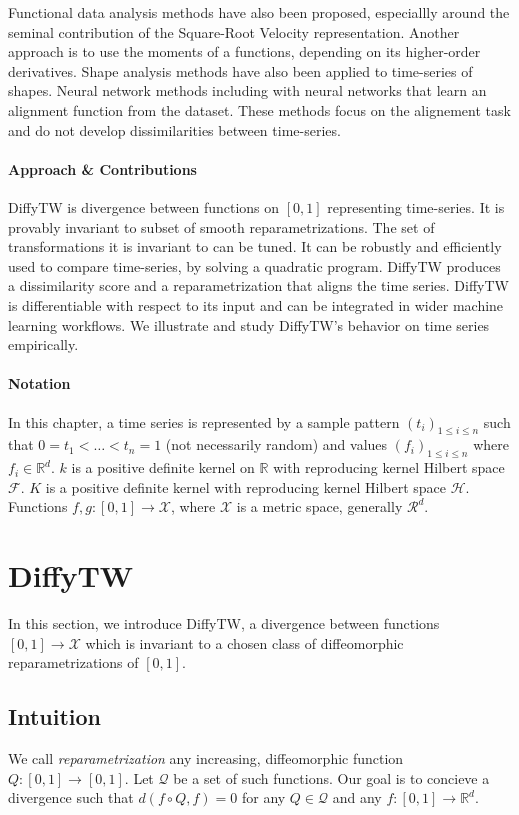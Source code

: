 Functional data analysis methods have also been proposed, especiallly around the seminal contribution of the Square-Root Velocity representation\citep{srvf}. Another approach is to use the moments of a functions, depending on its higher-order derivatives\citep{curve-moments}. Shape analysis methods have also been applied to time-series of shapes\citep{2108.05634,Durrleman2013}. Neural network methods including with neural networks that learn an alignment function from the dataset\citep{2106.11911,dtan,martinez22a}. These methods focus on the alignement task and do not develop dissimilarities between time-series.

\paragraph{Approach \& Contributions}
DiffyTW is divergence between functions on $[0,1]$ representing time-series. It is provably invariant to subset of smooth reparametrizations. The set of transformations it is invariant to can be tuned. It can be robustly and efficiently used to compare time-series, by solving a quadratic program. DiffyTW produces a dissimilarity score and a reparametrization that aligns the time series. DiffyTW is differentiable with respect to its input and can be integrated in wider machine learning workflows. We illustrate and study DiffyTW's behavior on time series empirically.

\paragraph{Notation} In this chapter, a time series is represented by a sample pattern $(t_i)_{1 \leq i \leq n}$ such that $0 = t_1 < \ldots < t_n = 1$ (not necessarily random) and values $(f_i)_{1\leq i\leq n}$ where $f_i \in\mathbb R^d$. $k$ is a positive definite kernel on $\mathbb R$ with reproducing kernel Hilbert space $\mathcal F$. $K$ is a positive definite kernel with reproducing kernel Hilbert space $\mathcal H$. Functions $f,g:[0,1] \to \mathcal X$, where $\mathcal X$ is a metric space, generally $\mathcal R^d$.

\section{DiffyTW}
In this section, we introduce DiffyTW, a divergence between functions $[0,1] \to \mathcal X$ which is invariant to a chosen class of diffeomorphic reparametrizations of $[0,1]$.

\subsection{Intuition}\label{sec:diffytw-intuition}
We call \emph{reparametrization} any increasing, diffeomorphic function $Q:[0,1] \to [0,1]$. Let $\mathcal Q$ be a set of such functions. Our goal is to concieve a divergence such that $d(f\circ Q, f) = 0$ for any $Q\in\mathcal Q$ and any $f:[0,1] \to \mathbb R^d$.

